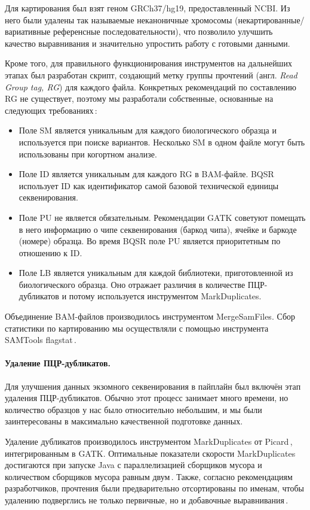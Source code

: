 \documentclass[a4paper,14pt]{extarticle}
\newcommand{\utilname}[1]{\textenglish{#1}}
\newcommand{\ecitep}[1]{\textenglish{\citep{#1}}}
\newcommand{\engterm}[1]{англ. \textenglish{\textit{#1}}}
\begin{document}
Для картирования был взят геном GRCh37/hg19, предоставленный NCBI.
Из него были удалены так называемые неканоничные хромосомы (некартированные/вариативные референсные последовательности), что позволило улучшить качество выравнивания и значительно упростить работу с готовыми данными.

Кроме того, для правильного функционирования инструментов на дальнейших этапах был разработан скрипт, создающий метку группы прочтений (\engterm{Read Group tag, RG}) для каждого файла.
Конкретных рекомендаций по составлению RG не существует, поэтому мы разработали собственные, основанные на следующих требованиях\,\ecitep{Auwera_2013}:

\begin{itemize}
	\item Поле SM является уникальным для каждого биологического образца и используется при поиске вариантов.
	 Несколько SM в одном файле могут быть использованы при когортном анализе.
	\item Поле ID является уникальным для каждого RG в BAM-файле.
	 BQSR использует ID как идентификатор самой базовой технической единицы секвенирования.
	\item Поле PU не является обязательным.
	 Рекомендации GATK советуют помещать в него информацию о чипе секвенирования (баркод чипа), ячейке и баркоде (номере) образца.
	 Во время BQSR поле PU является приоритетным по отношению к ID.
	\item Поле LB является уникальным для каждой библиотеки, приготовленной из биологического образца.
	 Оно отражает различия в количестве ПЦР\hyp{}дубликатов и потому используется инструментом \utilname{MarkDuplicates}.
\end{itemize}

Объединение BAM-файлов производилось инструментом \utilname{MergeSamFiles}.
Сбор статистики по картированию мы осуществляли с помощью инструмента \utilname{SAMTools flagstat}\,\ecitep{Li_2009_SAMTools}.

\paragraph{Удаление ПЦР\hyp{}дубликатов.}
Для улучшения данных экзомного секвенирования в пайплайн был включён этап удаления ПЦР\hyp{}дубликатов.
Обычно этот процесс занимает много времени, но количество образцов у нас было относительно небольшим, и мы были заинтересованы в максимально качественной подготовке данных.

Удаление дубликатов производилось инструментом \utilname{MarkDuplicates} от Picard\,\ecitep{PicardTools}, интегрированным в \utilname{GATK}.
Оптимальные показатели скорости \utilname{MarkDuplicates} достигаются при запуске \utilname{Java} с параллелизацией сборщиков мусора и количеством сборщиков мусора равным двум\,\ecitep{Heldenbrand_2019}.
Также, согласно рекомендациям разработчиков, прочтения были предварительно отсортированы по именам, чтобы удалению подверглись не только первичные, но и добавочные выравнивания\,\ecitep{Auwera_2013}.
\end{document}
